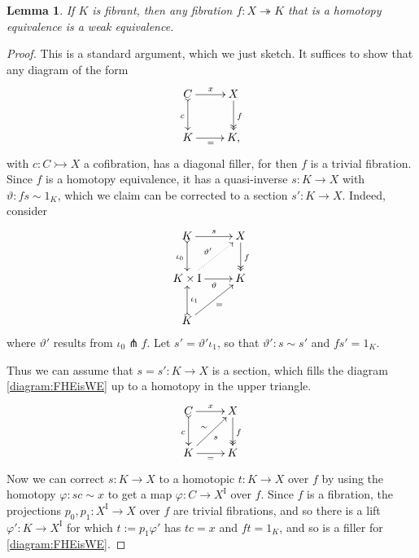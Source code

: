 \documentclass[11pt,reqno]{amsart}
\newcommand{\mono}{\ensuremath{\rightarrowtail}}
\newcommand{\ra}{\ensuremath{\rightarrow}}
\newcommand{\onto}{\ensuremath{\twoheadrightarrow}}
\newcommand{\I}{\ensuremath{\mathrm{I}}}
\newtheorem{lemma}[theorem]{Lemma}
\theoremstyle{remark}
\theoremstyle{definition}
\begin{document}
\begin{lemma}\label{FibHETFib}
If $K$ is fibrant, then any fibration $f : X \onto K$ that is a homotopy equivalence is a weak equivalence.
\end{lemma}
\begin{proof}
This is a standard argument, which we just sketch.  It suffices to show that any diagram of the form
\begin{equation}\label{diagram:FHEisWE}
\xymatrix{
C \ar@{>->}[d]_{c} \ar[r]^x & X \ar@{>>}[d]^{f} \\
K\ar[r]_{=} & K,
}
\end{equation}
with  $c : C \mono X$  a cofibration, has a diagonal filler, for then $f$ is a trivial fibration.  
Since $f$ is a homotopy equivalence, it has a quasi-inverse $s:K\ra X$ with $\vartheta : fs\sim 1_K$, which we claim can be corrected to a section $s' : K\ra X$. 
Indeed, consider 
\begin{equation*}%
\xymatrix{
K \ar@{>->}[d]_{\iota_0} \ar[r]^{s}  & X\ar@{>>}[d]^{f} \\
K\times \I \ar[r]_{\vartheta} \ar@{..>}[ru]^{\vartheta'}& K\\
K \ar@{>->}[u]_{\iota_1} \ar[ru]_=&
}
\end{equation*}
where $\vartheta' $ results from $\iota_0 \pitchfork f$. Let $s' = \vartheta' \iota_1$, so that $\vartheta' : s\sim s'$ and $fs' = 1_K$.

Thus we can assume that $s = s' : K\ra X$ is a section, which fills the diagram \eqref{diagram:FHEisWE} up to a homotopy in the upper triangle.
\begin{equation*}%
\xymatrix{
C \ar@{>->}[d]_{c} \ar[r]^x & X \ar@{>>}[d]^{f} \\
K\ar[r]_{=} \ar[ru]_{s}^{\sim} & K
}
\end{equation*}
Now we can correct $s: K\ra X$ to a homotopic $t : K\ra X$ over $f$ by using the homotopy $\varphi : sc\sim x$  to get a map $\varphi : C\ra X^\I$ over $f$.  Since $f$ is a fibration, the projections $p_0, p_1:X^\I \ra X$ over $f$ are trivial fibrations, and so there is a lift $\varphi': K\ra X^\I$ for which $t:= p_1\varphi'$ has $tc= x$ and $ft=1_K$, and so is a filler for \eqref{diagram:FHEisWE}.
\end{proof}
\end{document}
